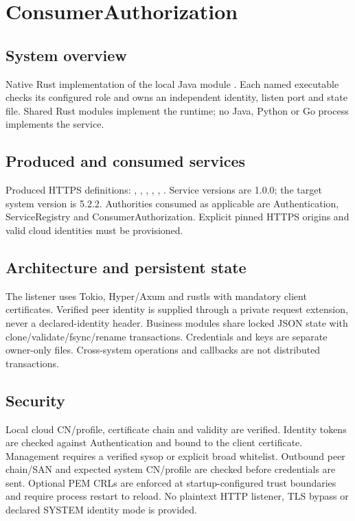 \documentclass[a4paper]{arrowhead}
\begin{document}
\ArrowheadSetup
\section{ConsumerAuthorization}
\subsection{System overview}
Native Rust implementation of the local Java module . Each named executable checks its configured role and owns an independent identity, listen port and state file. Shared Rust modules implement the runtime; no Java, Python or Go process implements the service.
\subsection{Produced and consumed services}
Produced HTTPS definitions: , \allowbreak {}, \allowbreak {}, \allowbreak {}, \allowbreak {}, \allowbreak {}. Service versions are 1.0.0; the target system version is 5.2.2. Authorities consumed as applicable are Authentication, ServiceRegistry and ConsumerAuthorization. Explicit pinned HTTPS origins and valid cloud identities must be provisioned.
\subsection{Architecture and persistent state}
The listener uses Tokio, Hyper/Axum and rustls with mandatory client certificates. Verified peer identity is supplied through a private request extension, never a declared-identity header. Business modules share locked JSON state with clone/validate/fsync/rename transactions. Credentials and keys are separate owner-only files. Cross-system operations and callbacks are not distributed transactions.
\subsection{Security}
Local cloud CN/profile, certificate chain and validity are verified. Identity tokens are checked against Authentication and bound to the client certificate. Management requires a verified sysop or explicit broad whitelist. Outbound peer chain/SAN and expected system CN/profile are checked before credentials are sent. Optional PEM CRLs are enforced at startup-configured trust boundaries and require process restart to reload. No plaintext HTTP listener, TLS bypass or declared SYSTEM identity mode is provided.
\end{document}
